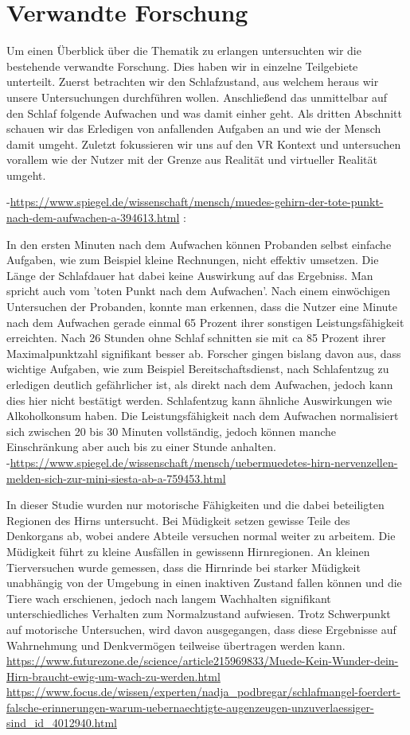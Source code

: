 \chapter{Verwandte Forschung}\label{sec:relatedWork}
Um einen Überblick über die Thematik zu erlangen untersuchten wir die bestehende verwandte Forschung. Dies haben wir in einzelne Teilgebiete unterteilt. Zuerst betrachten wir den Schlafzustand, aus welchem heraus wir unsere Untersuchungen durchführen wollen. Anschließend das unmittelbar auf den Schlaf folgende Aufwachen und was damit einher geht. Als dritten Abschnitt schauen wir das Erledigen von anfallenden Aufgaben an und wie der Mensch damit umgeht. Zuletzt fokussieren wir uns auf den VR Kontext und untersuchen vorallem wie der Nutzer mit der Grenze aus Realität und virtueller Realität umgeht.\\


 -\url{https://www.spiegel.de/wissenschaft/mensch/muedes-gehirn-der-tote-punkt-nach-dem-aufwachen-a-394613.html} :
 
 In den ersten Minuten nach dem Aufwachen können Probanden selbst einfache Aufgaben, wie zum Beispiel kleine Rechnungen, nicht effektiv umsetzen. Die Länge der Schlafdauer hat dabei keine Auswirkung auf das Ergebniss. Man spricht auch vom 'toten Punkt nach dem Aufwachen'. Nach einem einwöchigen Untersuchen der Probanden, konnte man erkennen, dass die Nutzer eine Minute nach dem Aufwachen gerade einmal 65 Prozent ihrer sonstigen Leistungsfähigkeit erreichten. Nach 26 Stunden ohne Schlaf schnitten sie mit ca 85 Prozent ihrer Maximalpunktzahl signifikant besser ab. Forscher gingen bislang davon aus, dass wichtige Aufgaben, wie zum Beispiel Bereitschaftsdienst, nach Schlafentzug zu erledigen deutlich gefährlicher ist, als direkt nach dem Aufwachen, jedoch kann dies hier nicht bestätigt werden.
 Schlafentzug kann ähnliche Auswirkungen wie Alkoholkonsum haben.
 Die Leistungsfähigkeit nach dem Aufwachen normalisiert sich zwischen 20 bis 30 Minuten vollständig, jedoch können manche Einschränkung aber auch bis zu einer Stunde anhalten. \\

-\url{https://www.spiegel.de/wissenschaft/mensch/uebermuedetes-hirn-nervenzellen-melden-sich-zur-mini-siesta-ab-a-759453.html}

In dieser Studie wurden nur motorische Fähigkeiten und die dabei beteiligten Regionen des Hirns untersucht. Bei Müdigkeit setzen gewisse Teile des Denkorgans ab, wobei andere Abteile versuchen normal weiter zu arbeitem. Die Müdigkeit führt zu kleine Ausfällen in gewissenn Hirnregionen. An kleinen Tierversuchen wurde gemessen, dass die Hirnrinde bei starker Müdigkeit unabhängig von der Umgebung in einen inaktiven Zustand fallen können und die Tiere wach erschienen, jedoch nach langem Wachhalten signifikant unterschiedliches Verhalten zum Normalzustand aufwiesen. Trotz Schwerpunkt auf motorische Untersuchen, wird davon ausgegangen, dass diese Ergebnisse auf Wahrnehmung und Denkvermögen teilweise übertragen werden kann.\\



\url{https://www.futurezone.de/science/article215969833/Muede-Kein-Wunder-dein-Hirn-braucht-ewig-um-wach-zu-werden.html}
\url{https://www.focus.de/wissen/experten/nadja_podbregar/schlafmangel-foerdert-falsche-erinnerungen-warum-uebernaechtigte-augenzeugen-unzuverlaessiger-sind_id_4012940.html}
